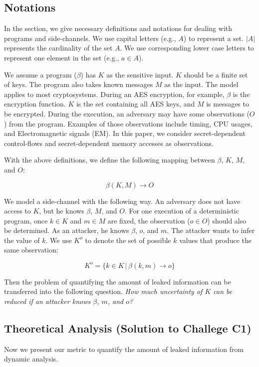 \subsection{Notations}
In the section, we give necessary definitions and notations for dealing with
programs and side-channels. We use capital letters (e.g., $A$) to represent a
set. $|A|$ represents the cardinality of the set $A$. We use corresponding lower case
letters to represent one element in the set (e.g., $a \in A$).

We assume a program ($\beta$) has $K$ as the sensitive input. $K$ should be a
finite set of keys. The program also takes known messages $M$ as the input. The
model applies to most cryptosystems. During an AES encryption, for example, 
$\beta$ is the encryption function. $K$ is the set containing all AES keys, 
and $M$ is messages to be
encrypted. During the execution, an adversary may have some observations ($O$)
from the program. Examples of those observations include timing, CPU usages, and
Electromagnetic signals (EM). In this paper, we consider secret-dependent
control-flows and secret-dependent memory accesses as observations.

With the above definitions, we define the following mapping between $\beta$,
$K$, $M$, and $O$:

\begin{displaymath}
    \beta(K, M) \rightarrow O
\end{displaymath}

We model a side-channel with the following way. An adversary does not have
access to $K$, but he knows $\beta$, $M$, and $O$. For one execution of a
deterministic program, once $k \in K$ and $m \in M$ are fixed, the observation
($o \in O$) should also be determined. As an attacker, he knows $\beta$, $o$,
and $m$. The attacker wants to infer the value of $k$. We use $K^o$ to denote
the set of possible $k$ values that produce the same observation:

\begin{displaymath}
    K^o = \{ k \in K \, |\, \beta(k, m) \rightarrow o\}
\end{displaymath}

Then the problem of quantifying the amount of leaked information can be
transferred into the following question.
\emph{How much uncertainty of $K$ can be reduced if an attacker knows $\beta$, $m$, and $o$?}

\subsection{Theoretical Analysis \textbf{(Solution to Challege C1)}}
Now we present our metric to quantify the amount of leaked information from
dynamic analysis.

